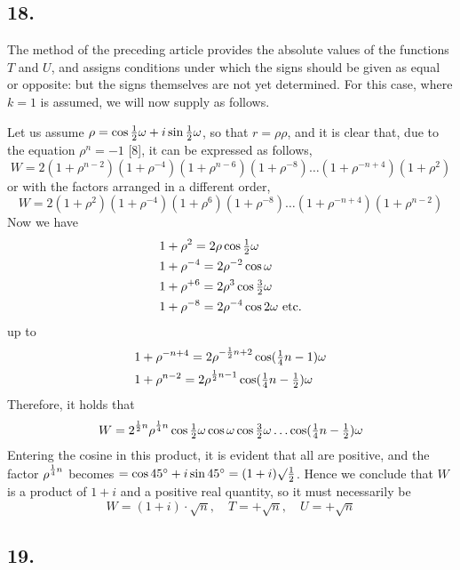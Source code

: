\documentclass[twoside,12pt, showframe]{memoir}
\let\oldfrac\frac
\def\frac#1#2{\mathchoice{\tfrac{#1}{#2}}{\oldfrac{#1}{#2}}{\genfrac{}{}{}{2}{#1}{#2\mathstrut}}{\genfrac{}{}{}{3}{#1}{#2\mathstrut}}}
\begin{document}
\subsection*{18.}
 
The method of the preceding article provides the absolute values of the functions \(T\) and \(U\), and assigns conditions under which the signs should be given as equal or opposite: but the signs themselves are not yet determined. For this case, where \(k=1\) is assumed, we will now supply as follows.
 
Let us assume \(\rho=\cos \frac{1}{2} \omega+i \sin \frac{1}{2} \omega\), so that \(r=\rho \rho\), and it is clear that, due to the equation \(\rho^{n}=-1\) [8], it can be expressed as follows,
\[W=2(1+\rho^{n-2})(1+\rho^{-4})(1+\rho^{n-6})(1+\rho^{-8}) \ldots(1+\rho^{-n+4})(1+\rho^{2})\]
or with the factors arranged in a different order,
\[W=2(1+\rho^{2})(1+\rho^{-4})(1+\rho^{6})(1+\rho^{-8}) \ldots(1+\rho^{-n+4})(1+\rho^{n-2})\]
Now we have
\[\begin{aligned}
& 1+\rho^{2}=2 \rho \cos \frac{1}{2} \omega \\
& 1+\rho^{-4}=2 \rho^{-2} \cos \omega \\
& 1+\rho^{+6}=2 \rho^{3} \cos \frac{3}{2} \omega \\
& 1+\rho^{-8}=2 \rho^{-4} \cos 2 \omega \text{ etc.}
\end{aligned}\]
up to
\[\begin{aligned}
& 1+\rho^{-n+4}=2 \rho^{-\frac{1}{2} n+2} \cos (\frac{1}{4} n-1) \omega \\
& 1+\rho^{n-2}=2 \rho^{\frac{1}{2} n-1} \cos (\frac{1}{4} n-\frac{1}{2}) \omega
\end{aligned}\]
Therefore, it holds that\clearpage\noindent%
\[W=2^{\frac{1}{2} n} \rho^{\frac{1}{4} n} \cos \frac{1}{2} \omega \cos \omega \cos \frac{3}{2} \omega \ldots \cos (\frac{1}{4} n-\frac{1}{2}) \omega\]
Entering the cosine in this product, it is evident that all are positive, and the factor \(\rho^{\frac{1}{4}n}\) becomes \(=\cos 45^{\circ}+i \sin 45^{\circ}=(1+i) \surd \frac{1}{2}\). Hence we conclude that \(W\) is a product of \(1+i\) and a positive real quantity, so it must necessarily be
\[W=(1+i) \cdot \surd n, \quad T=+\surd n, \quad U=+\surd n\]
%

\subsection*{19.}
\end{document}
